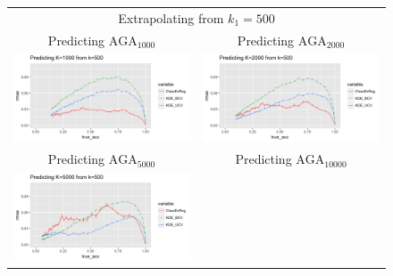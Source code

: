 \documentclass[twoside,11pt]{article}
\newenvironment{myfont}{\fontfamily{phv}\selectfont}{\par}
\begin{document}
\begin{figure}[p]
\centering
\begin{tabular}{cc}
\multicolumn{2}{c}{\begin{myfont}Extrapolating from $k_1 = 500$\end{myfont}}\\
\begin{myfont}Predicting $\text{AGA}_{1000}$\end{myfont} &
\begin{myfont}Predicting $\text{AGA}_{2000}$\end{myfont}\\
\includegraphics[scale = 0.5, clip = true, trim = 0 0 1.25in 0.45in]{sim_large7_K1_k0_5.png} &
\includegraphics[scale = 0.5, clip = true, trim = 0 0 0 0.45in]{sim_large7_K2_k0_5.png}\\
\begin{myfont}Predicting $\text{AGA}_{5000}$\end{myfont} &
\begin{myfont}Predicting $\text{AGA}_{10000}$\end{myfont}\\
\includegraphics[scale = 0.5, clip = true, trim = 0 0 1.25in 0.45in]{sim_large7_K5_k0_5.png} &

\end{tabular}
\end{figure}
\end{document}
